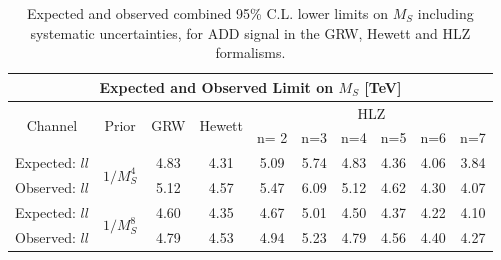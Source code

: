 \begin{table}[]
  \begin{center}
    \begin{tabular}{c|c|c|c|cccccc}
        \hline
        \hline
        \multicolumn{10}{c}{Expected and Observed Limit on $M_{S}$ [TeV]} \\
        \hline
        \multirow{2}{*}{Channel} & \multirow{2}{*}{Prior} & \multirow{2}{*}{GRW} & \multirow{2}{*}{Hewett} & \multicolumn{6}{c}{HLZ} \\
        \cline{5-10}
                &       &     &        & n= 2 &  n=3 & n=4 & n=5 & n=6 & n=7 \\
        \hline
        \hline
        Expected: $ll$      & \multirow{2}{*}{$1/M_{S}^{4}$} & 4.83 & 4.31 & 5.09 & 5.74 & 4.83 & 4.36 & 4.06 & 3.84 \\
        Observed: $ll$      &  & 5.12 & 4.57 & 5.47 & 6.09 & 5.12 & 4.62 & 4.30 & 4.07 \\
        \hline
        Expected: $ll$      & \multirow{2}{*}{$1/M_{S}^{8}$} & 4.60 & 4.35 & 4.67 & 5.01 & 4.50 & 4.37 & 4.22 & 4.10 \\
        Observed: $ll$      &  & 4.79 & 4.53 & 4.94 & 5.23 & 4.79 & 4.56 & 4.40 & 4.27 \\
        \hline
        \hline
    \end{tabular}
  \end{center}
    \caption{Expected and observed combined 95\% C.L. lower limits on $M_{S}$ including systematic uncertainties, for ADD signal in the GRW, Hewett and HLZ formalisms.
    \label{tab:ADD_results_formalisms_comb}}
\end{table}



